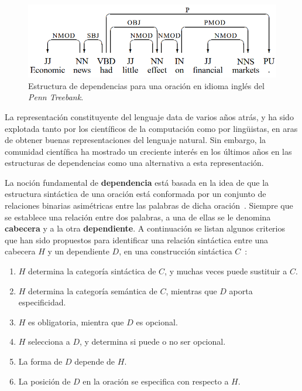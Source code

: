 \begin{figure}[h!]
	\centering
	\includegraphics[width=0.8\linewidth]{Graphics/dep_links.png}
	\caption{Estructura de dependencias para una oración en idioma inglés del \emph{Penn Treebank}.}\label{fig:dep_links}
\end{figure}

La representación constituyente del lenguaje data de varios años atrás, y ha sido explotada tanto por los científicos de la computación como por lingüistas, en aras de obtener buenas representaciones del lenguaje natural.
Sin embargo, la comunidad científica ha mostrado un creciente interés en los últimos años en las estructuras de dependencias como una alternativa a esta representación.

La noción fundamental de \textbf{dependencia} está basada en la idea de que la estructura sintáctica de una oración está conformada por un conjunto de relaciones binarias asimétricas entre las palabras de dicha oración~\cite{nivre2005dependency}.
Siempre que se establece una relación entre dos palabras, a una de ellas se le denomina \textbf{cabecera} y a la otra \textbf{dependiente}.
A continuación se listan algunos criterios que han sido propuestos para identificar una relación sintáctica entre una cabecera $H$ y un dependiente $D$, en una construcción sintáctica $C$~\cite{zwicky1985heads, richard1990english}:

\begin{enumerate}
	\item $H$ determina la categoría sintáctica de $C$, y muchas veces puede sustituir a $C$.
	
	\item $H$ determina la categoría semántica de $C$, mientras que $D$ aporta especificidad.
	
	\item $H$ es obligatoria, mientra que $D$ es opcional.
	
	\item $H$ selecciona a $D$, y determina si puede o no ser opcional.
	
	\item La forma de $D$ depende de $H$.
	
	\item La posición de $D$ en la oración se especifica con respecto a $H$.
\end{enumerate}

